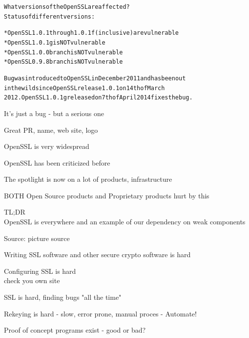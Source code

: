 \documentclass[20pt,landscape,a4paper,footrule]{foils}
\begin{document}
\begin{alltt}
What versions of the OpenSSL are affected?
Status of different versions:

* OpenSSL 1.0.1 through 1.0.1f (inclusive) are vulnerable
* OpenSSL 1.0.1g is NOT vulnerable
* OpenSSL 1.0.0 branch is NOT vulnerable
* OpenSSL 0.9.8 branch is NOT vulnerable

Bug was introduced to OpenSSL in December 2011 and has been out
in the wild since OpenSSL release 1.0.1 on 14th of March 
2012. OpenSSL 1.0.1g released on 7th of April 2014 fixes the bug.
\end{alltt}

\vskip 1cm
\centerline{It's just a bug - but a serious one}


\begin{list1}
\item Great PR, name, web site, logo 
\item OpenSSL is very widespread
\item OpenSSL has been criticized before
\item The spotlight is now on a lot of products, infrastructure
\item BOTH Open Source products and Proprietary products hurt by this
\item TL;DR\\ OpenSSL is everywhere and an example of our dependency on weak components
\end{list1}


Source: picture source\\ {\footnotesize{}}
\begin{list2}
\item Writing SSL software and other secure crypto software is hard
\item Configuring SSL is hard\\
check you own site 
\item SSL is hard, finding bugs "all the time"
\item Rekeying is hard - slow, error prone, manual proces - Automate!
\item Proof of concept programs exist - good or bad?
\end{list2}
\end{document}
